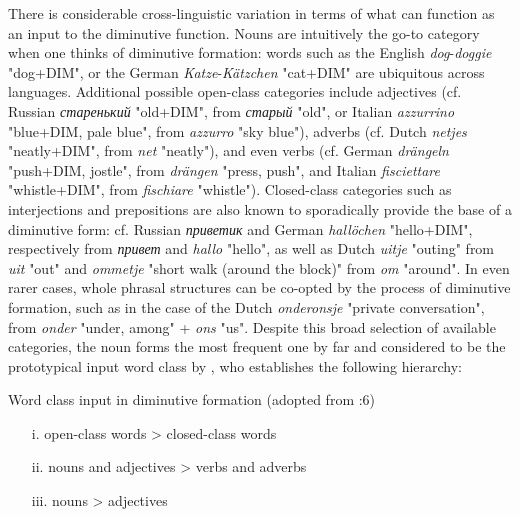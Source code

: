 There is considerable cross-linguistic variation in terms of what can function as an input to the diminutive function. Nouns are intuitively the go-to category when one thinks of diminutive formation: words such as the English \textit{dog}-\textit{doggie} "dog+DIM", or the German \textit{Katze}-\textit{Kätzchen} "cat+DIM" are ubiquitous across languages. Additional possible open-class categories include adjectives (cf. Russian \textit{старенький} "old+DIM", from \textit{старый} "old", or Italian \textit{azzurrino} "blue+DIM, pale blue", from \textit{azzurro} "sky blue"), adverbs (cf. Dutch \textit{netjes} "neatly+DIM", from \textit{net} "neatly"), and even verbs (cf. German \textit{drängeln} "push+DIM, jostle", from \textit{drängen} "press, push", and Italian \textit{fisciettare} "whistle+DIM", from \textit{fischiare} "whistle"). Closed-class categories such as interjections and prepositions are also known to sporadically provide the base of a diminutive form: cf. Russian \textit{приветик} and German \textit{hallöchen} "hello+DIM", respectively from \textit{привет} and \textit{hallo} "hello", as well as Dutch \textit{uitje} "outing" from \textit{uit} "out" and \textit{ommetje} "short walk (around the block)" from \textit{om} "around". In even rarer cases, whole phrasal structures can be co-opted by the process of diminutive formation, such as in the case of the Dutch \textit{onderonsje} "private conversation", from \textit{onder} "under, among" + \textit{ons} "us". Despite this broad selection of available categories, the noun forms the most frequent one by far and considered to be the prototypical input word class by \cite{Schneider+2003}, who establishes the following hierarchy:

\begin{exe}
\ex \label{ex:inputhierarchy}
Word class input in diminutive formation (adopted from \citeauthor{Schneider+2003} \citeyear{Schneider+2003}:6)
\begin{enumerate}
\item[i.] open-class words > closed-class words
\item[ii.] nouns and adjectives > verbs and adverbs
\item[iii.] nouns > adjectives
\end{enumerate}
\end{exe}

